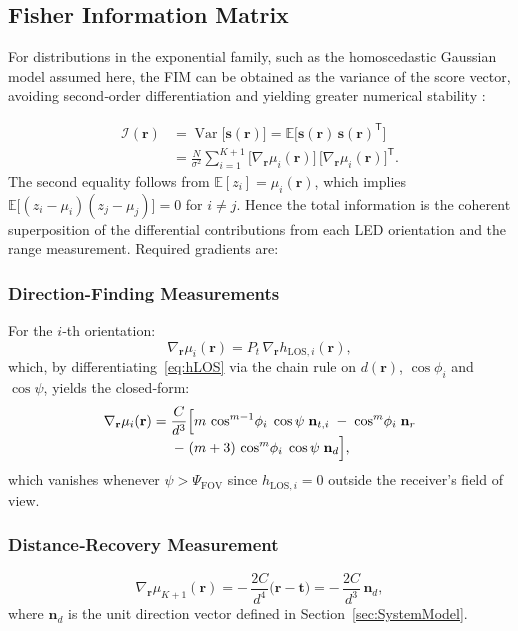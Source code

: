 \documentclass[journal]{IEEEtran}
\begin{document}
\subsection{Fisher Information Matrix}

For distributions in the exponential family, such as the homoscedastic Gaussian model assumed here, the FIM can be obtained as the variance of the score vector, avoiding second‐order differentiation and yielding greater numerical stability \cite{Kay1993}:

\begin{align}
\mathcal{I}(\mathbf r)
&= \operatorname{Var}\!\bigl[\mathbf s(\mathbf r)\bigr]
  = \mathbb{E}\!\bigl[\mathbf s(\mathbf r)\,\mathbf s(\mathbf r)^{\mathsf T}\bigr]
\\
&= \frac{N}{\sigma^{2}}
  \sum_{i=1}^{K+1}
  \bigl[\nabla_{\mathbf r}\mu_i(\mathbf r)\bigr]\,
  \bigl[\nabla_{\mathbf r}\mu_i(\mathbf r)\bigr]^{\!\mathsf T}.
\label{eq:FIM_general}
\end{align}
The second equality follows from \(\mathbb{E}[z_i]=\mu_i(\mathbf r)\), which implies
\(\mathbb{E}\bigl[(z_i-\mu_i)(z_j-\mu_j)\bigr]=0\) for \(i\neq j\).  Hence the total information
is the coherent superposition of the differential contributions from each LED orientation and the range measurement. Required gradients are:
\subsubsection{Direction-Finding Measurements}
For the $i$‑th orientation:
    \begin{equation}
      \nabla_{\mathbf r}\mu_i(\mathbf r)
      = P_{t}\,\nabla_{\mathbf r}h_{\mathrm{LOS},i}(\mathbf r),
    \end{equation}
which, by differentiating~\eqref{eq:hLOS} via the chain rule on \(d(\mathbf r)\), \(\cos\phi_i\) and \(\cos\psi\), yields the closed‐form:
\begin{multline}
    \nabla_{\mathbf r}\mu_i(\mathbf r)
    = \frac{C}{d^{3}}
      \Bigl[
        m\,\cos^{m-1}\!\phi_i\;\cos\psi\;\mathbf n_{t,i}
        \;-\;
        \cos^{m}\!\phi_i\;\mathbf n_{r}
    \\[-3pt]
        \;-\;
        (m+3)\,\cos^{m}\!\phi_i\;\cos\psi\;\mathbf n_{d}
      \Bigr],
    \label{eq:grad_mu_closed}
\end{multline}
which vanishes whenever \(\psi>\Psi_{\mathrm{FOV}}\) since
\(h_{\mathrm{LOS},i}=0\) outside the receiver’s field of view.

\subsubsection{Distance‐Recovery Measurement}
\begin{equation}
      \nabla_{\mathbf r}\mu_{K+1}(\mathbf r)
      = -\,\frac{2C}{d^{4}}\bigl(\mathbf r-\mathbf t\bigr)
      = -\,\frac{2C}{d^{3}}\,\mathbf n_{d},
\end{equation}
where \(\mathbf n_{d}\) is the unit direction vector defined in Section~\ref{sec:SystemModel}.
\end{document}
